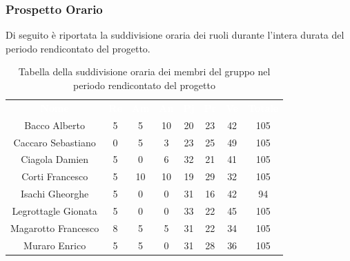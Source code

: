 \subsubsection{Prospetto Orario}
Di seguito è riportata la suddivisione oraria dei ruoli durante l'intera durata del periodo rendicontato del progetto.


\begin{table}[H]	
	\begin{center}
	    \begin{tabular}{cccccccc}
			\rowcolor{greySWEight}
			\textcolor{white}{\textbf{Nome}} & \textcolor{white}{\textbf{Re}} & \textcolor{white}{\textbf{Am}} & \textcolor{white}{\textbf{An}} & \textcolor{white}{\textbf{Pj}} & \textcolor{white}{\textbf{Pr}} & \textcolor{white}{\textbf{Ve}} & \textcolor{white}{\textbf{Totale}}
			\\			
%
			Bacco Alberto & 5 & 5 & 10 & 20 & 23 & 42 & 105 \\
			Caccaro Sebastiano & 0 & 5 & 3 & 23 & 25 & 49 & 105 \\
			Ciagola Damien & 5 & 0 & 6 & 32 & 21 & 41 & 105 \\
			Corti Francesco & 5 & 10 & 10 & 19 & 29 & 32 & 105 \\
			Isachi Gheorghe & 5 & 0 & 0 & 31 & 16 & 42 & 94 \\
			Legrottagle Gionata & 5 & 0 & 0 & 33 & 22 & 45 & 105 \\
			Magarotto Francesco & 8 & 5 & 5 & 31 & 22 & 34 & 105 \\
			Muraro Enrico & 5 & 5 & 0 & 31 & 28 & 36 & 105 \\
			\end{tabular}
	    \caption{Tabella della suddivisione oraria dei membri del gruppo nel periodo rendicontato del progetto} \label{tab:tabellaPersoneTotale} 
	\end{center}
\end{table}


